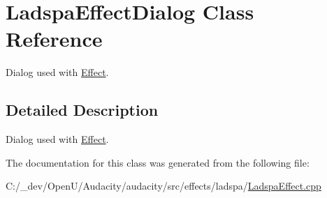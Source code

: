\hypertarget{class_ladspa_effect_dialog}{}\section{Ladspa\+Effect\+Dialog Class Reference}
\label{class_ladspa_effect_dialog}


Dialog used with \hyperlink{class_effect}{Effect}.  




\subsection{Detailed Description}
Dialog used with \hyperlink{class_effect}{Effect}. 

The documentation for this class was generated from the following file\+:\begin{DoxyCompactItemize}
\item 
C\+:/\+\_\+dev/\+Open\+U/\+Audacity/audacity/src/effects/ladspa/\hyperlink{_ladspa_effect_8cpp}{Ladspa\+Effect.\+cpp}\end{DoxyCompactItemize}
